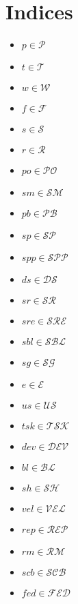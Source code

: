 \documentclass{article}
\begin{document}
\section{Indices}
\begin{itemize}
    \item $p \in \mathcal{P}$
    \item $t \in \mathcal{T}$
    \item $w \in \mathcal{W}$
    \item $f \in \mathcal{F}$
    \item $s \in \mathcal{S}$
    \item $r \in \mathcal{R}$
    \item $po \in \mathcal{PO}$
    \item $sm \in \mathcal{SM}$
    \item $pb \in \mathcal{PB}$
    \item $sp \in \mathcal{SP}$
    \item $spp \in \mathcal{SPP}$
    \item $ds \in \mathcal{DS}$
    \item $sr \in \mathcal{SR}$
    \item $sre \in \mathcal{SRE}$
    \item $sbl \in \mathcal{SBL}$
    \item $sg \in \mathcal{SG}$
    \item $e \in \mathcal{E}$
    \item $us \in \mathcal{US}$
    \item $tsk \in \mathcal{TSK}$
    \item $dev \in \mathcal{DEV}$
    \item $bl \in \mathcal{BL}$
    \item $sh \in \mathcal{SH}$
    \item $vel \in \mathcal{VEL}$
    \item $rep \in \mathcal{REP}$
    \item $rm \in \mathcal{RM}$
    \item $scb \in \mathcal{SCB}$
    \item $fed \in \mathcal{FED}$
\end{itemize}
\end{document}
